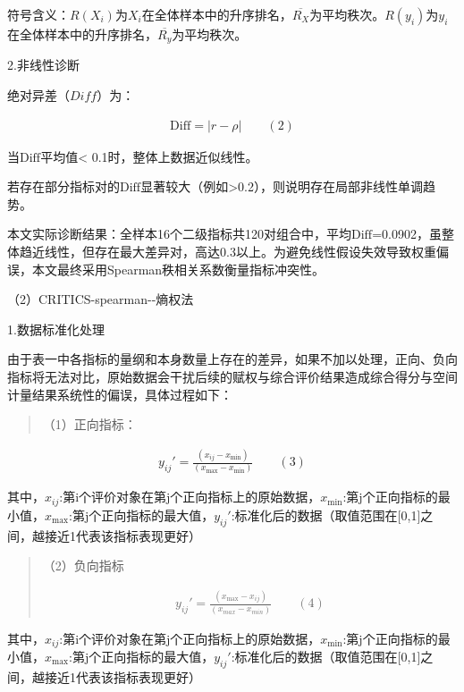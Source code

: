 \documentclass[UTF8,a4paper,12pt,fontset=windows]{ctexart}
\begin{document}
符号含义：\(R\left( X_{i} \right)\)为\(X_{i}\)在全体样本中的升序排名，\(\overline{R_{X}}\)为平均秩次。\(R\left( y_{i} \right)\)为\(y_{i}\)在全体样本中的升序排名，\(\overline{R_{y}}\)为平均秩次。

2.非线性诊断

绝对异差（\(Diff\)）为：

\[\begin{array}{r}
\text{Diff} = |r - \rho|\qquad(2)
\end{array}\]

当\(\text{Diff}\)平均值\textless{} 0.1时，整体上数据近似线性。

若存在部分指标对的\(\text{Diff}\)显著较大（例如\textgreater0.2），则说明存在局部非线性单调趋势。

本文实际诊断结果：全样本16个二级指标共120对组合中，平均\(\text{Diff}\)=0.0902，虽整体趋近线性，但存在最大差异对，高达0.3以上。为避免线性假设失效导致权重偏误，本文最终采用Spearman秩相关系数衡量指标冲突性。

（2）CRITICS-spearman-\/-熵权法

1.数据标准化处理

由于表一中各指标的量纲和本身数量上存在的差异，如果不加以处理，正向、负向指标将无法对比，原始数据会干扰后续的赋权与综合评价结果造成综合得分与空间计量结果系统性的偏误，具体过程如下：

\begin{quote}
（1）正向指标：
\end{quote}

\[\begin{array}{r}
y_{ij}' = \frac{\left( x_{ij} - x_{\min} \right)}{\left( x_{\max} - x_{\min} \right)}\qquad(3)
\end{array}\]

其中，\(x_{ij}\):第i个评价对象在第j个正向指标上的原始数据，\(x_{\min}\):第j个正向指标的最小值，\(x_{\max}\):第j个正向指标的最大值，\(y_{ij}'\):标准化后的数据（取值范围在{[}0,1{]}之间，越接近1代表该指标表现更好）

\begin{quote}
（2）负向指标

\[\begin{array}{r}
y_{ij}' = \frac{\left( x_{\max} - x_{ij} \right)}{\left( x_{max} - x_{min} \right)}\qquad(4)
\end{array}\]
\end{quote}

其中，\(x_{ij}\):第i个评价对象在第j个正向指标上的原始数据，\(x_{\min}\):第j个正向指标的最小值，\(x_{\max}\):第j个正向指标的最大值，\(y_{ij}'\):标准化后的数据（取值范围在{[}0,1{]}之间，越接近1代表该指标表现更好）
\end{document}
